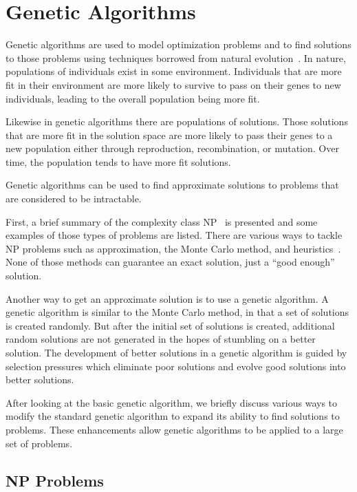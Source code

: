 \clearpage
\chapter{Genetic Algorithms}\label{chap:geneticAlgorithms}

Genetic algorithms are used to model optimization problems and to find solutions
to those problems using techniques borrowed from natural
evolution~\cite{Holland1992,goldberg1989genetic,fogel2000evolutionary}. In
nature, populations of individuals exist in some environment. Individuals that
are more fit in their environment are more likely to survive to pass on their
genes to new individuals, leading to the overall population being more fit.

Likewise in genetic algorithms there are populations of solutions. Those
solutions that are more fit in the solution space are more likely to pass their
genes to a new population either through reproduction, recombination, or
mutation. Over time, the population tends to have more fit solutions.

Genetic algorithms can be used to find approximate solutions to problems that
are considered to be intractable.

First, a brief summary of the complexity class
NP~\cite{alsuwaiyel1999algorithms,Cormen:2009:IAT:1614191} is presented and some
examples of those types of problems are listed. There are various ways to tackle
NP problems such as approximation, the Monte Carlo method, and
heuristics~\cite{russell2010artificial}. None of those methods can guarantee an
exact solution, just a ``good enough'' solution.

Another way to get an approximate solution is to use a genetic algorithm. A
genetic algorithm is similar to the Monte Carlo method, in that a set of
solutions is created randomly. But after the initial set of solutions is
created, additional random solutions are not generated in the hopes of stumbling
on a better solution. The development of better solutions in a genetic algorithm
is guided by selection pressures which eliminate poor solutions and evolve good
solutions into better solutions.

After looking at the basic genetic algorithm, we briefly discuss various ways to
modify the standard genetic algorithm to expand its ability to find solutions to
problems. These enhancements allow genetic algorithms to be applied to a large
set of problems.

\section{NP Problems}

